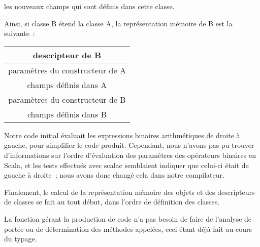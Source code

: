 \documentclass[a4paper,10pt]{article}
\newcommand{\code}[1]{{\fontfamily{pcr}\selectfont #1}}
\begin{document}
les nouveaux champs qui sont définis dans cette classe. \\ \par
Ainsi, si classe B étend la classe A, la représentation mémoire de B
est la suivante~: \\ \par
\begin{center}
\begin{tabular}{|c|}
\hline
\code{descripteur de B} \\ \hline
\code{paramètres du constructeur de A} \\ \hline
\code{champs définis dans A} \\ \hline
\code{paramètres du constructeur de B} \\ \hline
\code{champs définis dans B} \\ \hline
\end{tabular}
\end{center}

Notre code initial évaluait les expressions binaires arithmétiques de
droite à gauche, pour simplifier le code produit. Cependant, nous
n'avons pas pu trouver d'informations sur l'ordre d'évaluation des
paramètres des opérateurs binaires en Scala, et les tests effectués
avec \code{scalac} semblaient indiquer que celui-ci était de gauche à
droite~; nous avons donc changé cela dans notre compilateur. \\ \par
Finalement, le calcul de la représentation mémoire des objets et des
descripteurs de classes se fait au tout début, dans l'ordre de
définition des classes. \\ \par
La fonction gérant la production de code n'a pas besoin de faire de
l'analyse de portée ou de détermination des méthodes appelées, ceci
étant déjà fait au cours du typage.
\end{document}
